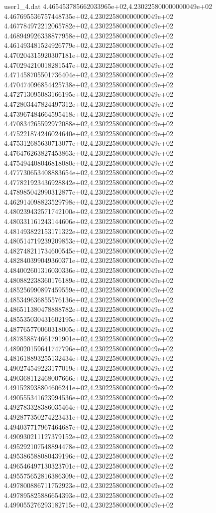 \begin{filecontents}{user1_4.dat}
4.465453785662033965e+02,4.230225800000000049e+02
4.467695536757448735e+02,4.230225800000000049e+02
4.467784972212065782e+02,4.230225800000000049e+02
4.468949926338877958e+02,4.230225800000000049e+02
4.461493481524926779e+02,4.230225800000000049e+02
4.470204315920307181e+02,4.230225800000000049e+02
4.470294210018281547e+02,4.230225800000000049e+02
4.471458705501736404e+02,4.230225800000000049e+02
4.470474096854425738e+02,4.230225800000000049e+02
4.472713095083166195e+02,4.230225800000000049e+02
4.472803447824497312e+02,4.230225800000000049e+02
4.473967484664595418e+02,4.230225800000000049e+02
4.470834265592972088e+02,4.230225800000000049e+02
4.475221874246024640e+02,4.230225800000000049e+02
4.475312685630713077e+02,4.230225800000000049e+02
4.476476263827453863e+02,4.230225800000000049e+02
4.475494408046818080e+02,4.230225800000000049e+02
4.477730653408883654e+02,4.230225800000000049e+02
4.477821923436928842e+02,4.230225800000000049e+02
4.478985042990312877e+02,4.230225800000000049e+02
4.462914098823529798e+02,4.230225800000000049e+02
4.480239432571742100e+02,4.230225800000000049e+02
4.480331161243144606e+02,4.230225800000000049e+02
4.481493822153171322e+02,4.230225800000000049e+02
4.480514719239209853e+02,4.230225800000000049e+02
4.482748211734600545e+02,4.230225800000000049e+02
4.482840399049360371e+02,4.230225800000000049e+02
4.484002601316030336e+02,4.230225800000000049e+02
4.480882238360176189e+02,4.230225800000000049e+02
4.485256990897459559e+02,4.230225800000000049e+02
4.485349636855576136e+02,4.230225800000000049e+02
4.486511380478888782e+02,4.230225800000000049e+02
4.485535030431602195e+02,4.230225800000000049e+02
4.487765770060318005e+02,4.230225800000000049e+02
4.487858874661791901e+02,4.230225800000000049e+02
4.489020159641747796e+02,4.230225800000000049e+02
4.481618893255132434e+02,4.230225800000000049e+02
4.490274549223177019e+02,4.230225800000000049e+02
4.490368112468007666e+02,4.230225800000000049e+02
4.491528938804606241e+02,4.230225800000000049e+02
4.490555341623994536e+02,4.230225800000000049e+02
4.492783328386035464e+02,4.230225800000000049e+02
4.492877350274223431e+02,4.230225800000000049e+02
4.494037717967464687e+02,4.230225800000000049e+02
4.490930211127379152e+02,4.230225800000000049e+02
4.495292107548894478e+02,4.230225800000000049e+02
4.495386588080439196e+02,4.230225800000000049e+02
4.496546497130323701e+02,4.230225800000000049e+02
4.495575652816386309e+02,4.230225800000000049e+02
4.497800886711752923e+02,4.230225800000000049e+02
4.497895825886654393e+02,4.230225800000000049e+02
4.499055276293182715e+02,4.230225800000000049e+02

\end{filecontents}
